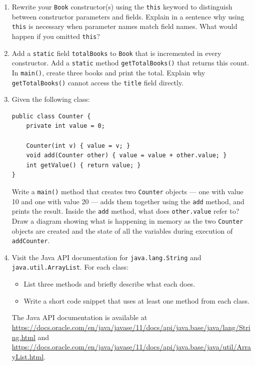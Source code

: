 \documentclass[twoside=false,DIV=14]{scrartcl}
\begin{document}
\begin{enumerate}
\item Rewrite your \texttt{Book} constructor(s) using the \texttt{this} keyword to distinguish between constructor parameters and fields.  Explain in a sentence why using \texttt{this} is necessary when parameter names match field names.  What would happen if you omitted \texttt{this}?

\item Add a \texttt{static} field \texttt{totalBooks} to \texttt{Book} that is incremented in every constructor.  Add a \texttt{static} method \texttt{getTotalBooks()} that returns this count.  In \texttt{main()}, create three books and print the total.  Explain why \texttt{getTotalBooks()} cannot access the \texttt{title} field directly.

\item Given the following class:
\begin{verbatim}
public class Counter {
    private int value = 0;
    
    Counter(int v) { value = v; }
    void add(Counter other) { value = value + other.value; }
    int getValue() { return value; }
}
\end{verbatim}
		Write a \texttt{main()} method that creates two \texttt{Counter} objects --- one with value 10 and one with value 20 --- adds them together using the \texttt{add} method, and prints the result.  Inside the \texttt{add} method, what does \texttt{other.value} refer to?  Draw a diagram showing what is happening in memory as the two \texttt{Counter} objects are created and the state of all the variables during execution of \texttt{addCounter}.

\item Visit the Java API documentation for \texttt{java.lang.String} and \texttt{java.util.ArrayList}.  For each class:
\begin{itemize}
    \item List three methods and briefly describe what each does.
    \item Write a short code snippet that uses at least one method from each class.
\end{itemize}
The Java API documentation is available at \url{https://docs.oracle.com/en/java/javase/11/docs/api/java.base/java/lang/String.html} and \url{https://docs.oracle.com/en/java/javase/11/docs/api/java.base/java/util/ArrayList.html}.

\end{enumerate}
\end{document}
